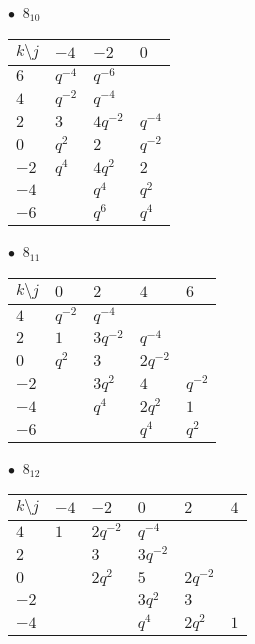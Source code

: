 %
\begin{minipage}{\linewidth}
$\bullet\ $ $8_{10}$ \vspace{0.5em} \\
\begin{tabular}{l|lll}
$k \setminus j$ & $-4$ & $-2$ & $0$ \\
\hline
$6$ & $q^{-4}$ & $q^{-6}$ &  \\
$4$ & $q^{-2}$ & $q^{-4}$ &  \\
$2$ & $3$ & $4q^{-2}$ & $q^{-4}$ \\
$0$ & $q^{2}$ & $2$ & $q^{-2}$ \\
$-2$ & $q^{4}$ & $4q^{2}$ & $2$ \\
$-4$ &  & $q^{4}$ & $q^{2}$ \\
$-6$ &  & $q^{6}$ & $q^{4}$ \\
\end{tabular}
\vspace{2em}
\end{minipage}
%
\begin{minipage}{\linewidth}
$\bullet\ $ $8_{11}$ \vspace{0.5em} \\
\begin{tabular}{l|llll}
$k \setminus j$ & $0$ & $2$ & $4$ & $6$ \\
\hline
$4$ & $q^{-2}$ & $q^{-4}$ &  &  \\
$2$ & $1$ & $3q^{-2}$ & $q^{-4}$ &  \\
$0$ & $q^{2}$ & $3$ & $2q^{-2}$ &  \\
$-2$ &  & $3q^{2}$ & $4$ & $q^{-2}$ \\
$-4$ &  & $q^{4}$ & $2q^{2}$ & $1$ \\
$-6$ &  &  & $q^{4}$ & $q^{2}$ \\
\end{tabular}
\vspace{2em}
\end{minipage}
%
\begin{minipage}{\linewidth}
$\bullet\ $ $8_{12}$ \vspace{0.5em} \\
\begin{tabular}{l|lllll}
$k \setminus j$ & $-4$ & $-2$ & $0$ & $2$ & $4$ \\
\hline
$4$ & $1$ & $2q^{-2}$ & $q^{-4}$ &  &  \\
$2$ &  & $3$ & $3q^{-2}$ &  &  \\
$0$ &  & $2q^{2}$ & $5$ & $2q^{-2}$ &  \\
$-2$ &  &  & $3q^{2}$ & $3$ &  \\
$-4$ &  &  & $q^{4}$ & $2q^{2}$ & $1$ \\
\end{tabular}
\vspace{2em}
\end{minipage}
